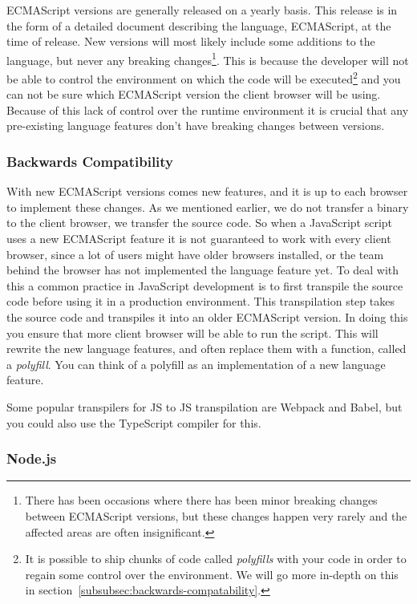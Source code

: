 ECMAScript versions are generally released on a yearly basis.
This release is in the form of a detailed document describing the language, ECMAScript, at the time of release.
New versions will most likely include some additions to the language, but never any breaking changes\footnote{There has been occasions where there has been minor breaking changes between ECMAScript versions, but these changes happen very rarely and the affected areas are often insignificant.}.
This is because the developer will not be able to control the environment on which the code will be executed\footnote{It is possible to ship chunks of code called \textit{polyfills} with your code in order to regain some control over the environment. We will go more in-depth on this in section~\vref{subsubsec:backwards-compatability}.} and you can not be sure which ECMAScript version the client browser will be using.
Because of this lack of control over the runtime environment it is crucial that any pre-existing language features don't have breaking changes between versions.

\subsubsection{Backwards Compatibility}\label{subsubsec:backwards-compatability}

With new ECMAScript versions comes new features, and it is up to each browser to implement these changes.
As we mentioned earlier, we do not transfer a binary to the client browser, we transfer the source code.
So when a JavaScript script uses a new ECMAScript feature it is not guaranteed to work with every client browser, since a lot of users might have older browsers installed, or the team behind the browser has not implemented the language feature yet.
To deal with this a common practice in JavaScript development is to first transpile the source code before using it in a production environment.
This transpilation step takes the source code and transpiles it into an older ECMAScript version.
In doing this you ensure that more client browser will be able to run the script.
This will rewrite the new language features, and often replace them with a function, called a \textit{polyfill}.
You can think of a polyfill as an implementation of a new language feature.

Some popular transpilers for JS to JS transpilation are Webpack and Babel, but you could also use the TypeScript compiler for this.

\subsubsection{Node.js}

